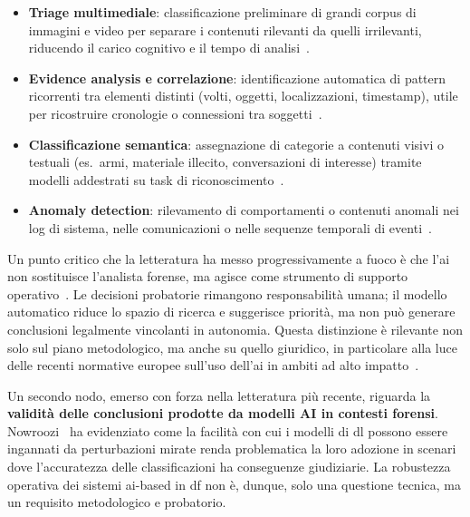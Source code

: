 \begin{itemize}
    \item \textbf{Triage multimediale}: classificazione preliminare di grandi corpus di immagini e video per separare i contenuti rilevanti da quelli irrilevanti, riducendo il carico cognitivo e il tempo di analisi~\cite{le2020survey}.
    \item \textbf{Evidence analysis e correlazione}: identificazione automatica di pattern ricorrenti tra elementi distinti (volti, oggetti, localizzazioni, timestamp), utile per ricostruire cronologie o connessioni tra soggetti~\cite{costantini2019digital}.
    \item \textbf{Classificazione semantica}: assegnazione di categorie a contenuti visivi o testuali (es.\ armi, materiale illecito, conversazioni di interesse) tramite modelli addestrati su task di riconoscimento~\cite{faqir2023digital}.
    \item \textbf{Anomaly detection}: rilevamento di comportamenti o contenuti anomali nei log di sistema, nelle comunicazioni o nelle sequenze temporali di eventi~\cite{brown2023anomaly}.
\end{itemize}

Un punto critico che la letteratura ha messo progressivamente a fuoco è che l'\gls{ai} non sostituisce l'analista forense, ma agisce come strumento di supporto operativo~\cite{rogers2020ai}. Le decisioni probatorie rimangono responsabilità umana; il modello automatico riduce lo spazio di ricerca e suggerisce priorità, ma non può generare conclusioni legalmente vincolanti in autonomia. Questa distinzione è rilevante non solo sul piano metodologico, ma anche su quello giuridico, in particolare alla luce delle recenti normative europee sull'uso dell'\gls{ai} in ambiti ad alto impatto~\cite{aiact2024}.

Un secondo nodo, emerso con forza nella letteratura più recente, riguarda la \textbf{validità delle conclusioni prodotte da modelli AI in contesti forensi}. Nowroozi~\cite{nowroozi2020phd} ha evidenziato come la facilità con cui i modelli di \gls{dl} possono essere ingannati da perturbazioni mirate renda problematica la loro adozione in scenari dove l'accuratezza delle classificazioni ha conseguenze giudiziarie. La robustezza operativa dei sistemi \gls{ai}-based in \gls{df} non è, dunque, solo una questione tecnica, ma un requisito metodologico e probatorio.

